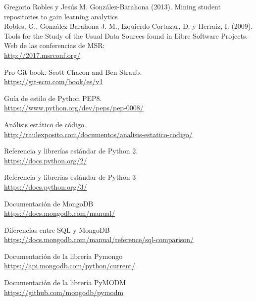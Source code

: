 
\cleardoublepage

\begin{thebibliography}{25}


 Gregorio Robles y Jesús M. González-Barahona (2013). Mining student repositories to gain learning analytics\\

 Robles, G., González-Barahona J. M., Izquierdo-Cortazar, D. y Herraiz, I. (2009). Tools for the Study of the Usual Data Sources found in Libre Software Projects.\\

 Web de las conferencias de MSR:   \\
{\footnotesize
\url{http://2017.msrconf.org/}} 

Pro Git book. Scott Chacon and Ben Straub.   \\
{\footnotesize
\url{https://git-scm.com/book/es/v1}} 

 Guía de estilo de Python PEP8.   \\
{\footnotesize
\url{https://www.python.org/dev/peps/pep-0008/}} 

Análisis estático de código.   \\
{\footnotesize
\url{http://raulexposito.com/documentos/analisis-estatico-codigo/}} 

Referencia y librerías estándar de Python 2.   \\
{\footnotesize
\url{https://docs.python.org/2/}} 

Referencia y librerías estándar de Python 3   \\
{\footnotesize
\url{https://docs.python.org/3/}} 

Documentación de MongoDB   \\
{\footnotesize
\url{https://docs.mongodb.com/manual/}} 

Diferencias entre SQL y MongoDB   \\
{\footnotesize
\url{https://docs.mongodb.com/manual/reference/sql-comparison/}} 

Documentación de la librería Pymongo   \\
{\footnotesize
\url{https://api.mongodb.com/python/current/}} 

Documentación de la librería PyMODM   \\
{\footnotesize
\url{https://github.com/mongodb/pymodm}} 


\end{thebibliography}
